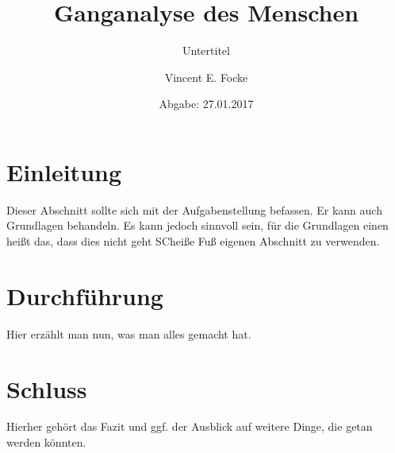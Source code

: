 \documentclass{scrartcl}%
\begin{document}
\titlehead{Kopf über dem Titel mit Leerstuhl u.\,ä.}%
\subject{Praktikumsbericht}%
\title{Ganganalyse des Menschen}%
\subtitle{Untertitel}%
\author{Vincent E. Focke}%
\date{Abgabe: 27.01.2017}%
\publishers{Betreuer: Nils Owsianowski \\ Leitung: Antonia B. Kesel}%
\maketitle%
\tableofcontents
\section{Einleitung}
\label{sec:motivation}
Dieser Abschnitt sollte sich mit der Aufgabenstellung befassen. Er kann auch
Grundlagen behandeln. Es kann jedoch sinnvoll sein, für die Grundlagen einen
heißt das, dass dies nicht geht SCheiße Fuß
eigenen Abschnitt zu verwenden.
\section{Durchführung}
\label{sec:durchfuehrung}
Hier erzählt man nun, was man alles gemacht hat.
\section{Schluss}
\label{sec:schluss}
Hierher gehört das Fazit und ggf. der Ausblick auf weitere Dinge, die getan
werden könnten.
\end{document}
